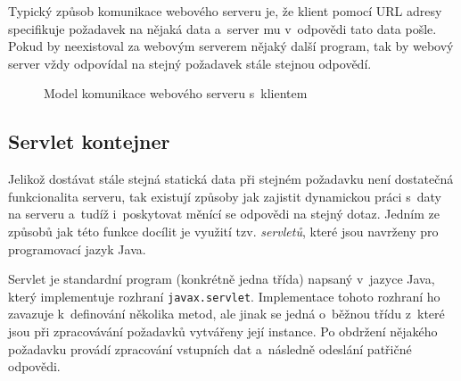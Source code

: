             Typický způsob komunikace webového serveru je, 
            že klient pomocí URL adresy specifikuje požadavek na nějaká
            data a~server mu v~odpovědi tato data pošle. Pokud by neexistoval za webovým serverem nějaký další
            program, tak by webový server vždy odpovídal na stejný požadavek stále stejnou odpovědí.

            \begin{figure}[ht]
                \begin{center}
                    \caption{Model komunikace webového serveru s~klientem \cite{webserverVsServletPage}}
                    \label{imgWebserver}
                \end{center}
            \end{figure}    %

        \subsection{Servlet kontejner} \label{servletKontejner}
            Jelikož dostávat stále stejná statická data při stejném požadavku není dostatečná funkcionalita serveru,
            tak existují způsoby jak zajistit dynamickou práci s~daty na serveru a~tudíž i~poskytovat
            měnící se odpovědi na stejný dotaz.
            Jedním ze způsobů jak této funkce docílit je využití tzv. \emph{servletů},
            které jsou navrženy pro programovací jazyk Java.

            Servlet je standardní program (konkrétně jedna třída) napsaný v~jazyce Java, 
            který implementuje rozhraní \texttt{javax.servlet}.
            Implementace tohoto rozhraní ho zavazuje k~definování několika metod, ale jinak se jedná o~běžnou
            třídu z~které jsou při zpracovávání požadavků vytvářeny její instance. Po obdržení nějakého
            požadavku provádí zpracování vstupních dat a~následně odeslání patřičné odpovědi.

